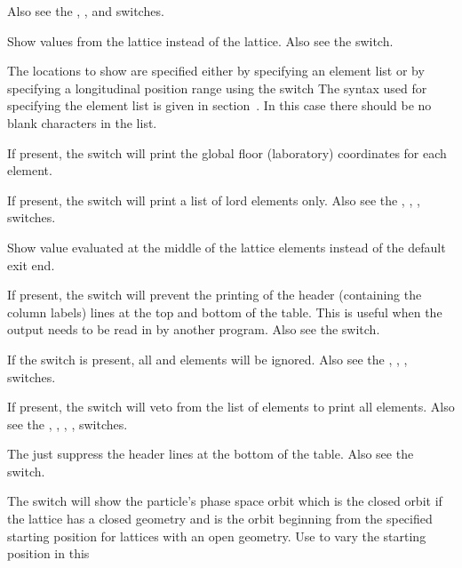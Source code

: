 {{{{{{{{\begin{description}
Also see the , , and  switches.
%
\item[-design] \Newline
  Show values from the  lattice instead of the  lattice. Also see the  switch.
%
\item[<element_list>] \Newline
The locations to show are specified either by specifying an element list or by specifying a
longitudinal position range using the  switch The syntax used for specifying the element list
is given in section~.  In this case there should be no blank characters in
the list.
%
\item[-floor_coords] \Newline
If present, the  switch will print the global floor (laboratory) coordinates for
each element.
%
\item[-lords] \Newline
If present, the  switch will print a list of lord elements only. Also see the
, , ,  switches.
%
\item[-middle] \Newline
Show value evaluated at the middle of the lattice elements instead of the default exit end.
%
\item[-no_label_lines] \Newline
If present, the  switch will prevent the printing of the header (containing the
column labels) lines at the top and bottom of the table.  This is useful when the output needs to be
read in by another program. Also see the  switch.
%
\item[-no_slaves] \Newline
If the  switch is present, all  and  elements
will be ignored. Also see the , , , 
switches.
%
\item[-no_super_slaves] \Newline
If present, the  switch will veto from the list of elements to print all
 elements. Also see the , , , ,
 switches.
%
\item[-no_tail_lines] \Newline
The  just suppress the header lines at the bottom of the table. Also see the
 switch.
%
\item[-orbit] \Newline
The  switch will show the particle's phase space orbit which is the closed orbit if the
lattice has a closed geometry and is the orbit beginning from the specified starting position for
lattices with an open geometry. Use  to vary the starting position in this

\end{description}}}}}}}}}
